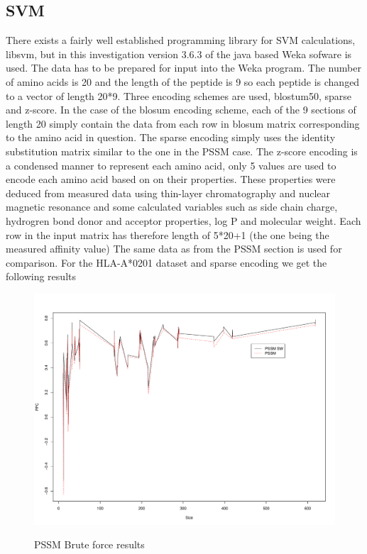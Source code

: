 \subsection*{SVM}
There exists a fairly well established programming library for SVM calculations, libsvm, but in this investigation version 3.6.3 of the java based Weka sofware is used. 
The data has to be prepared for input into the Weka program. 
The number of amino acids is 20 and the length of the peptide is 9 so each peptide is changed to a vector of length 20*9. 
Three encoding schemes are used, blostum50, sparse and z-score. 
In the case of the blosum encoding scheme, each of the 9 sections of length 20 simply contain the data from each row in blosum matrix corresponding to the amino acid in question.
The sparse encoding simply uses the identity substitution matrix similar to the one in the PSSM case. 
The z-score encoding is a condensed manner to represent each amino acid, only 5 values are used to encode each amino acid based on on their properties. 
These properties were deduced from measured data using thin-layer chromatography and nuclear magnetic resonance and some calculated variables 
such as side chain charge, hydrogren bond donor and acceptor properties, log P and molecular weight. 
Each row in the input matrix has therefore length of 5*20+1 (the one being the measured affinity value)
The same data as from the PSSM section is used for comparison. For the HLA-A*0201 dataset and sparse encoding we get the following results

\begin{figure}
\begin{center}
\includegraphics[width=13cm]{fig/pssm1.pdf}
\label{fig:pssm1}
\caption{PSSM Brute force results}
\end{center}
\end{figure}


